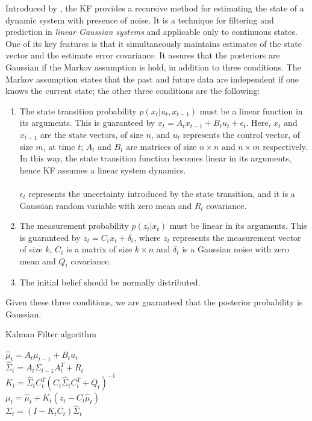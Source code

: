 Introduced by \cite{kalman}, the \ac{KF} provides a recursive method for estimating the state of a dynamic system with presence of noise. It is a technique for filtering and prediction in \emph{linear Gaussian systems} and applicable only to continuous states. One of its key features is that it simultaneously maintains estimates of the state vector and the estimate error covariance. It assures that the posteriors are Gaussian if the Markov assumption is hold, in addition to three conditions. The Markov assumption states that the past and future data are independent if one knows the current state; the other three conditions are the following:
\begin{enumerate}
    \item{The state transition probability $p\left( x_t | u_t, x_{t-1}\right)$ must be a linear function in its arguments. This is guaranteed by $ x_t = A_t x_{t-1} + B_t u_t + \epsilon_t $. Here, $x_t$ and $x_{t-1}$ are the state vectors, of size $n$, and $u_t$ represents the control vector, of size $m$, at time $t$; $A_t$ and $B_t$ are matrices of size $n \times n$ and $n\times m$ respectively. In this way, the state transition function becomes linear in its arguments, hence KF assumes a linear system dynamics. \\\\ $\epsilon_t$ represents the uncertainty introduced by the state transition, and it is a Gaussian random variable with zero mean and $R_t$ covariance.}
    \item{The measurement probability $p\left(z_t | x_t\right)$ must be linear in its arguments. This is guaranteed by $z_t = C_t x_t + \delta_t$, where $z_t$ represents the measurement vector of size $k$, $C_t$ is a matrix of size $k \times n$ and $\delta_t$ is a Gaussian noise with zero mean and $Q_t$ covariance.}
    \item{The initial belief should be normally distributed.}
\end{enumerate}
Given these three conditions, we are guaranteed that the posterior probability is Gaussian.

\begin{algorithm}[h]
    \caption{Kalman Filter algorithm}
    \label{alg:chapter1:kf}

    \BlankLine
    \BlankLine
    $\hat\mu_t = A_t \mu_{t-1} + B_t u_t$ \\
    $\hat\Sigma_t = A_t \Sigma_{t-1} A_t^T + R_t$ \\
    \BlankLine
    $K_t = \hat\Sigma_t C_t^T \left(C_t \hat\Sigma_t C_t^T + Q_t\right)^{-1}$ \\
    $\mu_t = \hat\mu_t + K_t \left(z_t - C_t \hat\mu_t \right) $ \\
    $\Sigma_t = (I - K_t C_t) \hat\Sigma_t$ \\
    \BlankLine
\end{algorithm}


